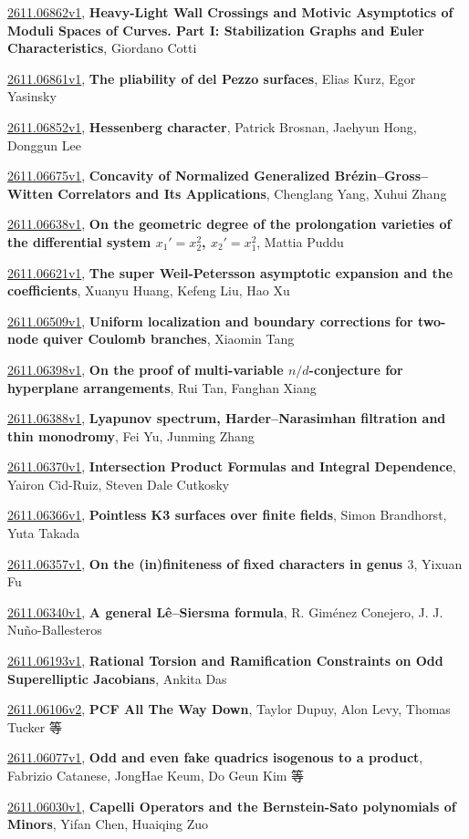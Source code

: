 \documentclass[9pt, a4paper]{article}
\theoremstyle{plain}
\theoremstyle{definition}
\theoremstyle{remark}
\newcommand{\arxiv}[3]{\href{https://arxiv.org/abs/#1}{#1}, \textbf{\textcolor{arxivblue}{#2}}, #3}
\begin{document}
\arxiv{2611.06862v1}{Heavy-Light Wall Crossings and Motivic Asymptotics of Moduli Spaces of Curves. Part I: Stabilization Graphs and Euler Characteristics}{Giordano Cotti}

\arxiv{2611.06861v1}{The pliability of del Pezzo surfaces}{Elias Kurz, Egor Yasinsky}

\arxiv{2611.06852v1}{Hessenberg character}{Patrick Brosnan, Jaehyun Hong, Donggun Lee}

\arxiv{2611.06675v1}{Concavity of Normalized Generalized Brézin--Gross--Witten Correlators and Its Applications}{Chenglang Yang, Xuhui Zhang}

\arxiv{2611.06638v1}{On the geometric degree of the prolongation varieties of the differential system $x_1'=x_2^2$, $x_2'=x_1^2$}{Mattia Puddu}

\arxiv{2611.06621v1}{The super Weil-Petersson asymptotic expansion and the coefficients}{Xuanyu Huang, Kefeng Liu, Hao Xu}

\arxiv{2611.06509v1}{Uniform localization and boundary corrections for two-node quiver Coulomb branches}{Xiaomin Tang}

\arxiv{2611.06398v1}{On the proof of multi-variable $n/d$-conjecture for hyperplane arrangements}{Rui Tan, Fanghan Xiang}

\arxiv{2611.06388v1}{Lyapunov spectrum, Harder--Narasimhan filtration and thin monodromy}{Fei Yu, Junming Zhang}

\arxiv{2611.06370v1}{Intersection Product Formulas and Integral Dependence}{Yairon Cid-Ruiz, Steven Dale Cutkosky}

\arxiv{2611.06366v1}{Pointless K3 surfaces over finite fields}{Simon Brandhorst, Yuta Takada}

\arxiv{2611.06357v1}{On the (in)finiteness of fixed characters in genus $3$}{Yixuan Fu}

\arxiv{2611.06340v1}{A general Lê--Siersma formula}{R. Giménez Conejero, J. J. Nuño-Ballesteros}

\arxiv{2611.06193v1}{Rational Torsion and Ramification Constraints on Odd Superelliptic Jacobians}{Ankita Das}

\arxiv{2611.06106v2}{PCF All The Way Down}{Taylor Dupuy, Alon Levy, Thomas Tucker 等}

\arxiv{2611.06077v1}{Odd and even fake quadrics isogenous to a product}{Fabrizio Catanese, JongHae Keum, Do Geun Kim 等}

\arxiv{2611.06030v1}{Capelli Operators and the Bernstein-Sato polynomials of Minors}{Yifan Chen, Huaiqing Zuo}
\end{document}
